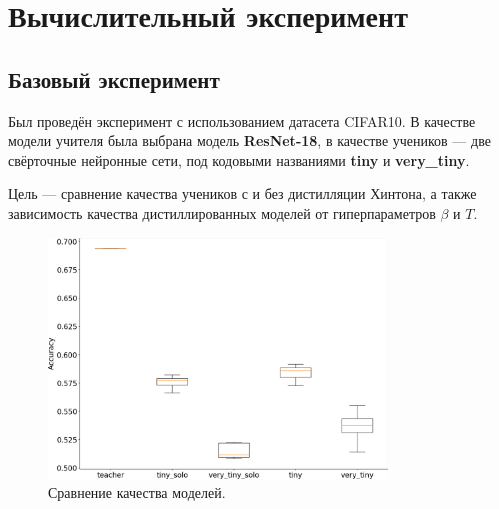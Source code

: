 \documentclass[14]{article}
\begin{document}
\section{Вычислительный эксперимент}

\subsection{Базовый эксперимент}

Был проведён эксперимент с использованием датасета CIFAR10. В качестве модели учителя была выбрана модель \textbf{ResNet-18},
в качестве учеников --- две свёрточные нейронные сети, под кодовыми названиями \textbf{tiny} и \textbf{very\_tiny}.

Цель --- сравнение качества учеников с и без дистилляции Хинтона, а также зависимость качества
дистиллированных моделей от гиперпараметров $\beta$ и $T$.

\begin{figure}[h]
  \includegraphics[width=9cm]{../figures/box_hinton_model_accuracy.png}
  \centering
  \caption{Сравнение качества моделей.}
\end{figure}
\end{document}

